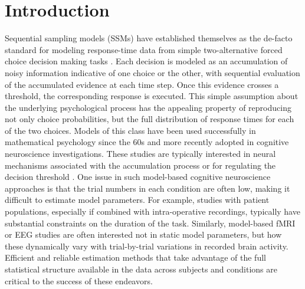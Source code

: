 \documentclass[letterpaper,10pt,english]{article}
\begin{document}

\section*{Introduction}
\label{intro:introduction}\label{intro:index-0}\label{intro:chap-introduction}\label{intro::doc}
Sequential sampling models (SSMs) \citep{TownsendAshby83} have
established themselves as the de-facto standard for modeling
response-time data from simple two-alternative forced choice decision
making tasks \citep{SmithRatcliff04}. Each decision is modeled as an
accumulation of noisy information indicative of one choice or the
other, with sequential evaluation of the accumulated evidence at each
time step. Once this evidence crosses a threshold, the corresponding
response is executed. This simple assumption about the underlying
psychological process has the appealing property of reproducing not
only choice probabilities, but the full distribution of response times
for each of the two choices. Models of this class have been used
successfully in mathematical psychology since the 60s and more
recently adopted in cognitive neuroscience investigations. These
studies are typically interested in neural mechanisms associated with
the accumulation process or for regulating the decision threshold
\citep[e.g.][]{ForstmannDutilhBrownEtAl08,CavanaghWieckiCohenEtAl11,RatcliffPhiliastidesSajda09}.
One issue in such model-based cognitive neuroscience approaches is
that the trial numbers in each condition are often low, making it
difficult to estimate model parameters. For example, studies with
patient populations, especially if combined with intra-operative
recordings, typically have substantial constraints on the duration of
the task. Similarly, model-based fMRI or EEG studies are often
interested not in static model parameters, but how these dynamically
vary with trial-by-trial variations in recorded brain activity.
Efficient and reliable estimation methods that take advantage of the
full statistical structure available in the data across subjects and
conditions are critical to the success of these endeavors.
\end{document}
